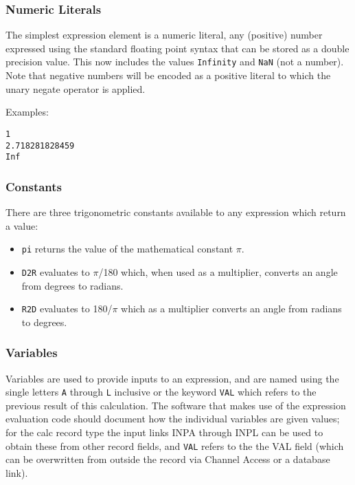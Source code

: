 \subsubsection{Numeric Literals}

The simplest expression element is a numeric literal, any (positive) number expressed using the standard floating point syntax that can be stored as a double precision value.
This now includes the values \verb|Infinity| and \verb|NaN| (not a number).
Note that negative numbers will be encoded as a positive literal to which the unary negate operator is applied.

Examples:

\begin{verbatim}
1
2.718281828459
Inf
\end{verbatim}

\subsubsection{Constants}

There are three trigonometric constants available to any expression which return a value:

\begin{itemize}
\item \verb|pi| returns the value of the mathematical constant $\pi$.

\item \verb|D2R| evaluates to $\pi$/180 which, when used as a multiplier, converts an angle from degrees to radians.

\item \verb|R2D| evaluates to 180/$\pi$ which as a multiplier converts an angle from radians to degrees.

\end{itemize}

\subsubsection{Variables}

Variables are used to provide inputs to an expression, and are named using the single letters \verb|A| through \verb|L| inclusive or the keyword \verb|VAL| which refers to the previous result of this calculation.
The software that makes use of the expression evaluation code should document how the individual variables are given values;
for the calc record type the input links INPA through INPL can be used to obtain these from other record fields, and \verb|VAL| refers to the the VAL field (which can be overwritten from outside the record via Channel Access or a database link).

